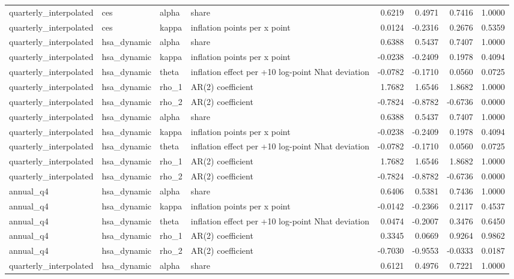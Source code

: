 \begin{tabular}{llllrrrr}
quarterly\_interpolated & ces & alpha & share & 0.6219 & 0.4971 & 0.7416 & 1.0000 \\
quarterly\_interpolated & ces & kappa & inflation points per x point & 0.0124 & -0.2316 & 0.2676 & 0.5359 \\
quarterly\_interpolated & hsa\_dynamic & alpha & share & 0.6388 & 0.5437 & 0.7407 & 1.0000 \\
quarterly\_interpolated & hsa\_dynamic & kappa & inflation points per x point & -0.0238 & -0.2409 & 0.1978 & 0.4094 \\
quarterly\_interpolated & hsa\_dynamic & theta & inflation effect per +10 log-point Nhat deviation & -0.0782 & -0.1710 & 0.0560 & 0.0725 \\
quarterly\_interpolated & hsa\_dynamic & rho\_1 & AR(2) coefficient & 1.7682 & 1.6546 & 1.8682 & 1.0000 \\
quarterly\_interpolated & hsa\_dynamic & rho\_2 & AR(2) coefficient & -0.7824 & -0.8782 & -0.6736 & 0.0000 \\
quarterly\_interpolated & hsa\_dynamic & alpha & share & 0.6388 & 0.5437 & 0.7407 & 1.0000 \\
quarterly\_interpolated & hsa\_dynamic & kappa & inflation points per x point & -0.0238 & -0.2409 & 0.1978 & 0.4094 \\
quarterly\_interpolated & hsa\_dynamic & theta & inflation effect per +10 log-point Nhat deviation & -0.0782 & -0.1710 & 0.0560 & 0.0725 \\
quarterly\_interpolated & hsa\_dynamic & rho\_1 & AR(2) coefficient & 1.7682 & 1.6546 & 1.8682 & 1.0000 \\
quarterly\_interpolated & hsa\_dynamic & rho\_2 & AR(2) coefficient & -0.7824 & -0.8782 & -0.6736 & 0.0000 \\
annual\_q4 & hsa\_dynamic & alpha & share & 0.6406 & 0.5381 & 0.7436 & 1.0000 \\
annual\_q4 & hsa\_dynamic & kappa & inflation points per x point & -0.0142 & -0.2366 & 0.2117 & 0.4537 \\
annual\_q4 & hsa\_dynamic & theta & inflation effect per +10 log-point Nhat deviation & 0.0474 & -0.2007 & 0.3476 & 0.6450 \\
annual\_q4 & hsa\_dynamic & rho\_1 & AR(2) coefficient & 0.3345 & 0.0669 & 0.9264 & 0.9862 \\
annual\_q4 & hsa\_dynamic & rho\_2 & AR(2) coefficient & -0.7030 & -0.9553 & -0.0333 & 0.0187 \\
quarterly\_interpolated & hsa\_dynamic & alpha & share & 0.6121 & 0.4976 & 0.7221 & 1.0000 \\

\end{tabular}
